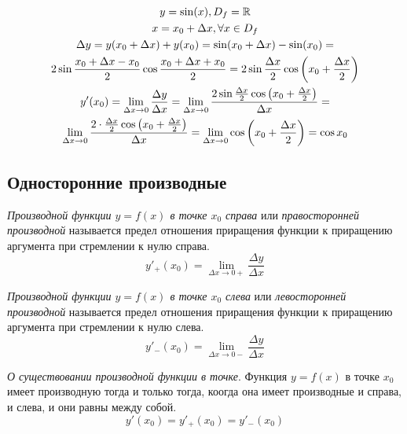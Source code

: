 \begin{eg}
  \begin{gather*}
    y = \sin(x), D_f = \mathbb{R} \\
    x = x_0 + \Delta x, \forall x \in D_f \\
  \Delta y = y(x_0 + \Delta x) + y(x_0) = \sin(x_0 + \Delta x) - \sin(x_0) = \\
  2\sin \frac{x_0 + \Delta x - x_0}{2} \cos \frac{x_0 + \Delta x + x_0}{2} = 2\sin \frac{\Delta x}{2} \cos \left(x_0 + \frac{\Delta x}{2}\right) \\
  y'(x_0) = \lim_{\Delta x \to 0} \frac{\Delta y}{\Delta x} = \lim_{\Delta x \to 0} \frac{2\sin \frac{\Delta x}{2} \cos \left( x_0 + \frac{\Delta x}{2} \right) }{\Delta x} = \\
  \lim_{\Delta x \to 0} \frac{2 \cdot \frac{\Delta x}{2} \cos\left( x_0 + \frac{\Delta x}{2} \right) }{\Delta x} = \lim_{\Delta x \to 0} \cos\left( x_0 + \frac{\Delta x}{2} \right) = \cos x_0
  \end{gather*}
\end{eg}

\subsection{Односторонние производные}

\begin{definition}
  \textit{Производной функции $y=f(x)$ в точке $x_0$ справа} или \textit{правосторонней производной} называется предел отношения приращения функции к приращению аргумента при стремлении к нулю справа. \[
  y'_+(x_0) = \lim_{\Delta x \to 0+} \frac{\Delta y}{\Delta x}
  \] 
\end{definition}

\begin{definition}
  \textit{Производной функции $y=f(x)$ в точке $x_0$ слева} или \textit{левосторонней производной} называется предел отношения приращения функции к приращению аргумента при стремлении к нулю слева. \[
  y'_-(x_0) = \lim_{\Delta x \to 0-} \frac{\Delta y}{\Delta x}
  \] 
\end{definition}

\begin{theorem}
  \textit{О существовании производной функции в точке}.
  Функция $y = f(x)$ в точке $x_0$ имеет производную тогда и только тогда, коогда она имеет производные и справа, и слева, и они равны между собой. \[
  y'(x_0) = y'_+(x_0) = y'_-(x_0)
  \] 
\end{theorem}

